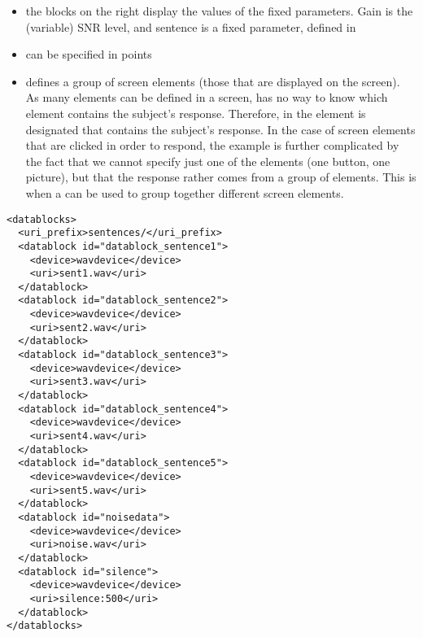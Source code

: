 \begin{itemize}
\begin{itemize}
\item {} the blocks on the right display the values
of the fixed parameters. Gain is the (variable) SNR level, and
sentence is a fixed parameter, defined in 

\item {} can be specified in points

\item {} defines a group of screen elements
(those that are displayed on the screen). As many elements can be
defined in a screen, \apex has no way to know which element
contains the subject's response. Therefore, in
 the element is designated that
contains the subject's response. In the case of screen elements
that are clicked in order to respond, the example is further
complicated by the fact that we cannot specify just one of the
elements (one button, one picture), but that the response rather comes
from a group of elements. This is when a  can
be used to group together different screen elements.


\end{itemize}
\end{itemize}
  
   
  

\begin{lstlisting}
<datablocks>
  <uri_prefix>sentences/</uri_prefix>
  <datablock id="datablock_sentence1">
    <device>wavdevice</device>
    <uri>sent1.wav</uri>
  </datablock>
  <datablock id="datablock_sentence2">
    <device>wavdevice</device>
    <uri>sent2.wav</uri>
  </datablock>
  <datablock id="datablock_sentence3">
    <device>wavdevice</device>
    <uri>sent3.wav</uri>
  </datablock>
  <datablock id="datablock_sentence4">
    <device>wavdevice</device>
    <uri>sent4.wav</uri>
  </datablock>
  <datablock id="datablock_sentence5">
    <device>wavdevice</device>
    <uri>sent5.wav</uri>
  </datablock>
  <datablock id="noisedata">
    <device>wavdevice</device>
    <uri>noise.wav</uri>
  </datablock>
  <datablock id="silence">
    <device>wavdevice</device>
    <uri>silence:500</uri>
  </datablock>
</datablocks>
\end{lstlisting}


